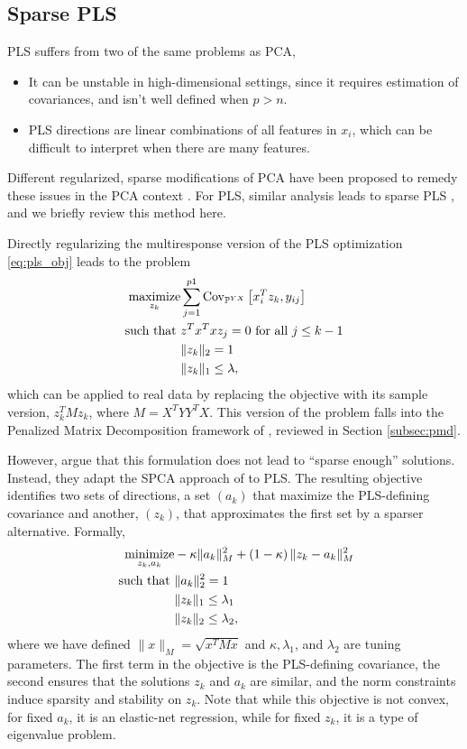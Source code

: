 \documentclass[utf8]{frontiersFPHY} %
\begin{document}
\subsection{Sparse PLS}
\label{subsec:spls}

PLS suffers from two of the same problems as PCA,
\begin{itemize}
\item It can be unstable in high-dimensional settings, since it requires
  estimation of covariances, and isn't well defined when $p > n$.
\item PLS directions are linear combinations of all features in $x_i$, which can
  be difficult to interpret when there are many features.
\end{itemize}

Different regularized, sparse modifications of PCA have been proposed to remedy
these issues in the PCA context \citep{jolliffe2003modified, zou2006sparse,
  witten2009penalized}. For PLS, similar analysis leads to sparse PLS
\citep{le2008sparse, chun2010sparse}, and we briefly review this method here.

Directly regularizing the multiresponse version of the PLS optimization
\ref{eq:pls_obj} leads to the problem
\begin{align*}
  \mathop\mathrm{maximize}_{z_k} &\sum_{j = 1}^{p1} \mathrm{Cov}_{\mathbb{P}^{YX}}\left[{x_i^T z_k, y_{ij}}\right]
  \\ \text{such that }&z^{T}x^{T}x z_{j} = 0 \text{ for all }j \leq k - 1
  \\ &\|z_k\|_2 = 1 \\ &\|z_k\|_1 \leq \lambda,
\end{align*}
which can be applied to real data by replacing the objective with its sample
version, $z_k^{T} M z_k$, where $M = X^{T}YY^{T}X$. This version of the problem
falls into the Penalized Matrix Decomposition framework of
\citep{witten2009penalized}, reviewed in Section \ref{subsec:pmd}.

However, \cite{chun2010sparse} argue that this formulation does not lead to
``sparse enough'' solutions. Instead, they adapt the SPCA approach of
\cite{zou2006sparse} to PLS. The resulting objective identifies two sets of
directions, a set $\left(a_k\right)$ that maximize the PLS-defining covariance
and another, $\left(z_k\right)$, that approximates the first set by a sparser
alternative. Formally,
\begin{align}
  \label{eq:spls_obj}
  \mathop\mathrm{minimize}_{z_k, a_k} &-\kappa \|a_k\|_M^2 + \left(1 - \kappa\right) \|z_k -
  a_k\|_M^2 \\ \text{ such that } & \|a_k\|_2^2 = 1 \nonumber \\ &\|z_k\|_1 \leq
  \lambda_1 \nonumber \\ &\|z_k\|_2 \leq \lambda_2, \nonumber
\end{align}
where we have defined $\|x\|_M = \sqrt{x^T M x}$ and $\kappa, \lambda_1$, and
$\lambda_2$ are tuning parameters. The first term in the objective is the
PLS-defining covariance, the second ensures that the solutions $z_k$ and $a_k$
are similar, and the norm constraints induce sparsity and stability on $z_k$.
Note that while this objective is not convex, for fixed $a_k$, it is an
elastic-net regression, while for fixed $z_k$, it is a type of eigenvalue
problem.
\end{document}
